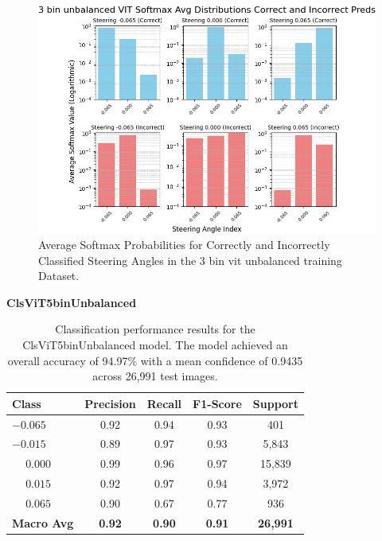 \begin{figure}[H]
    \centering
    \includegraphics[width=1\linewidth]{Figures/Results/3_bins_vit_softmax_dist_plot_unbalanced.png}
    \caption{Average Softmax Probabilities for Correctly and Incorrectly Classified Steering Angles in the 3 bin vit unbalanced training Dataset.}
    \label{fig:3_bins_vit_softmax_dist_unbalanced}
\end{figure}


\textbf{ClsViT5binUnbalanced}

\begin{table}[htbp]
\centering
\begin{tabular}{@{}lcccc@{}}
\toprule
\textbf{Class} & \textbf{Precision} & \textbf{Recall} & \textbf{F1-Score} & \textbf{Support} \\
\midrule
$-0.065$ & 0.92 & 0.94 & 0.93 & 401 \\
$-0.015$ & 0.89 & 0.97 & 0.93 & 5,843 \\
$\phantom{-}0.000$ & 0.99 & 0.96 & 0.97 & 15,839 \\
$\phantom{-}0.015$ & 0.92 & 0.97 & 0.94 & 3,972 \\
$\phantom{-}0.065$ & 0.90 & 0.67 & 0.77 & 936 \\
\midrule
\textbf{Macro Avg} & \textbf{0.92} & \textbf{0.90} & \textbf{0.91} & \textbf{26,991} \\
\bottomrule
\end{tabular}
\caption{Classification performance results for the ClsViT5binUnbalanced model. The model achieved an overall accuracy of 94.97\% with a mean confidence of 0.9435 across 26,991 test images.}
\label{tab:clf_report_ClsViT5binUnbalanced}
\end{table}

